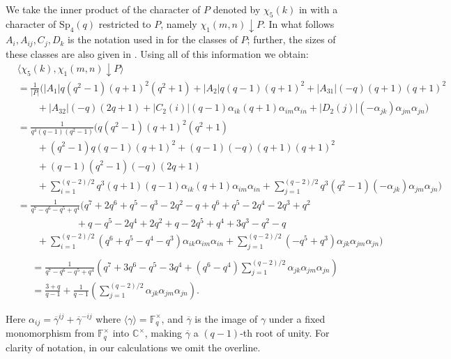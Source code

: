 \documentclass{amsart}
\begin{document}
We  take the inner product of the character of $P$ denoted by  $\chi_5(k)$ in  \cite{speven} with a character of $\mathrm{Sp}_4(q)$ restricted to $P$, namely $\chi_{1}(m, n)\downarrow P$. In what follows  $A_i,A_{ij}, C_j, D_k$ is the notation used  in \cite{speven} for the classes of $P$; further, the sizes of these classes are also given in \cite{speven}. Using all of this information we obtain:
\begin{align*}
&\langle \chi_5(k), \chi_1(m, n)\downarrow P\rangle\\&
=\frac{1}{|P|}\Big(
|A_1| q(q^2-1) (q+1)^2(q^2+1)
+|A_2| q(q-1) (q+1)^2 
+|A_{31}| (-q)(q+1) (q+1)^2\\
&\qquad + |A_{32}| (-q) (2q+1)
+|C_2(i)| (q-1)\alpha_{ik} (q+1)\alpha_{im}\alpha_{in} +|D_2(j)| (-\alpha_{jk}) \alpha_{jm}\alpha_{jn}
\Big)\\&
=\frac{1}{q^4(q-1)(q^2-1)}\Big(q(q^2-1) (q+1)^2(q^2+1)\\
&\qquad +(q^2-1) q(q-1) (q+1)^2
+(q-1) (-q)(q+1) (q+1)^2\\ 
&\qquad +(q-1)(q^2-1) (-q) (2q+1)\\ 
&\qquad +\sum_{i=1}^{(q-2)/2} q^3(q+1) (q-1)\alpha_{ik} (q+1)\alpha_{im}\alpha_{in}
+\sum_{j=1}^{(q-2)/2} q^3(q^2-1) (-\alpha_{jk}) \alpha_{jm}\alpha_{jn}\Big)\\
&=\frac{1}{q^7-q^6-q^5+q^4}\Big(q^7+2q^6+q^5-q^3-2q^2-q
 +q^6+q^5-2q^4-2q^3+q^2\\
 &\qquad \qquad \qquad +q
-q^5-2q^4+2q^2+q-2q^5+q^4+3q^3-q^2-q\\
&\qquad +\sum_{i=1}^{(q-2)/2} (q^6+q^5-q^4-q^3)\alpha_{ik}\alpha_{im}\alpha_{in}
+\sum_{j=1}^{(q-2)/2}(-q^5+q^3)\alpha_{jk}\alpha_{jm}\alpha_{jn}\Big)\\
\end{align*}
\begin{align*}&=
\frac{1}{q^7-q^6-q^5+q^4} \left(q^7+3q^6-q^5-3q^4+\left(q^6-q^4\right)\sum_{j=1}^{(q-2)/2} \alpha_{jk}\alpha_{jm}\alpha_{jn}\right)\\&
=\frac{3+q}{q-1}+\frac{1}{q-1}\left(\sum_{j=1}^{(q-2)/2} \alpha_{jk}\alpha_{jm}\alpha_{jn}\right).
\end{align*}

Here $\alpha_{ij} = \overline{\gamma}^{ij}+\overline{\gamma}^{-ij}$ where $\langle\gamma\rangle = \mathbb{F}_q^\times$, and $\overline{\gamma}$ is the image of $\gamma$ under a fixed monomorphism from $\mathbb{F}_q^\times$ into $\mathbb{C}^\times$, making $\overline{\gamma}$ a $(q-1)$-th root of unity. For clarity of notation, in our calculations we omit the overline.
\end{document}

